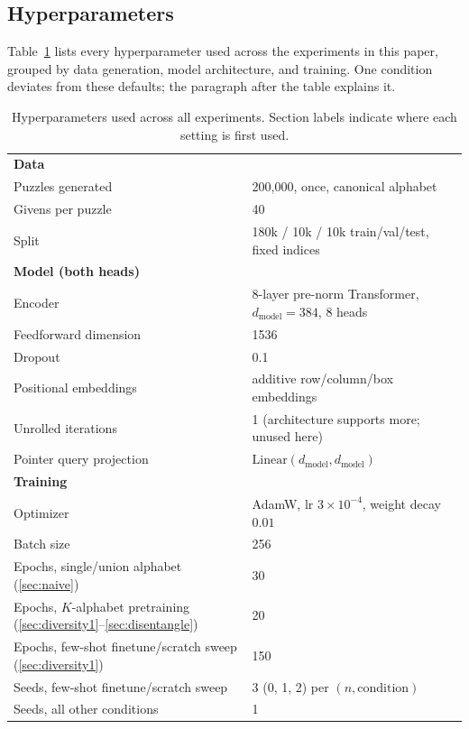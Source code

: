 \documentclass{article} %
\begin{document}
\subsection{Hyperparameters}
\label{app:hyperparams}

Table~\ref{tab:hyperparams} lists every hyperparameter used across the
experiments in this paper, grouped by data generation, model
architecture, and training. One condition deviates from these defaults;
the paragraph after the table explains it.

\begin{table}[h]
\centering
\small
\begin{tabular}{@{}p{}p{}@{}}
\hline
\textbf{Data} & \\
Puzzles generated & 200{,}000, once, canonical alphabet \\
Givens per puzzle & 40 \\
Split & 180k / 10k / 10k train/val/test, fixed indices \\
\hline
\textbf{Model (both heads)} & \\
Encoder & 8-layer pre-norm Transformer, $d_{\text{model}}=384$, 8 heads \\
Feedforward dimension & 1536 \\
Dropout & 0.1 \\
Positional embeddings & additive row/column/box embeddings \\
Unrolled iterations & 1 (architecture supports more; unused here) \\
Pointer query projection & $\mathrm{Linear}(d_{\text{model}}, d_{\text{model}})$ \\
\hline
\textbf{Training} & \\
Optimizer & AdamW, lr $3\times10^{-4}$, weight decay $0.01$ \\
Batch size & 256 \\
Epochs, single/union alphabet (\ref{sec:naive}) & 30 \\
Epochs, $K$-alphabet pretraining (\ref{sec:diversity1}--\ref{sec:disentangle}) & 20 \\
Epochs, few-shot finetune/scratch sweep (\ref{sec:diversity1}) & 150 \\
Seeds, few-shot finetune/scratch sweep & 3 (0, 1, 2) per $(n, \text{condition})$ \\
Seeds, all other conditions & 1 \\
\hline
\end{tabular}
\caption{Hyperparameters used across all experiments. Section labels
indicate where each setting is first used.}
\label{tab:hyperparams}
\end{table}
\end{document}
